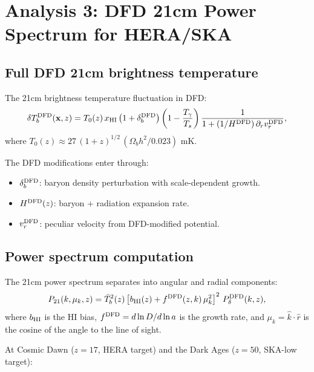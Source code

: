\documentclass[11pt]{article}
\begin{document}
\section{Analysis 3: DFD 21cm Power Spectrum for HERA/SKA}
\label{sec:21cm-exact}

\subsection{Full DFD 21cm brightness temperature}

The 21cm brightness temperature fluctuation in DFD:
\begin{equation}
\delta T_b^{\rm DFD}(\mathbf{x}, z) = T_0(z)\,x_{\rm HI}\left(1 + \delta_b^{\rm DFD}\right)\left(1 - \frac{T_\gamma}{T_s}\right)\frac{1}{1 + (1/H^{\rm DFD})\,\partial_r v_r^{\rm DFD}},
\end{equation}
where $T_0(z) \approx 27\,(1+z)^{1/2}\,(\Omega_b h^2/0.023)$ mK.

The DFD modifications enter through:
\begin{itemize}
\item $\delta_b^{\rm DFD}$: baryon density perturbation with scale-dependent growth.
\item $H^{\rm DFD}(z)$: baryon + radiation expansion rate.
\item $v_r^{\rm DFD}$: peculiar velocity from DFD-modified potential.
\end{itemize}

\subsection{Power spectrum computation}

The 21cm power spectrum separates into angular and radial components:
\begin{equation}
P_{21}(k, \mu_k, z) = \bar{T}_b^2(z)\left[b_{\rm HI}(z) + f^{\rm DFD}(z,k)\,\mu_k^2\right]^2\,P_\delta^{\rm DFD}(k,z),
\end{equation}
where $b_{\rm HI}$ is the HI bias, $f^{\rm DFD} = d\ln D/d\ln a$ is the growth rate, and $\mu_k = \hat{k}\cdot\hat{r}$ is the cosine of the angle to the line of sight.

At Cosmic Dawn ($z = 17$, HERA target) and the Dark Ages ($z = 50$, SKA-low target):
\end{document}

